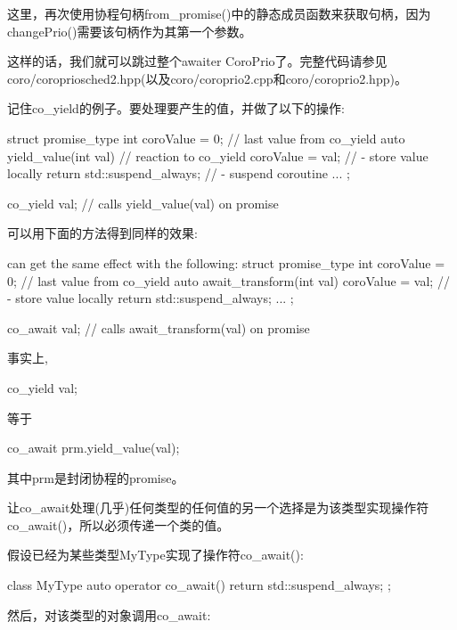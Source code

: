这里，再次使用协程句柄from\_promise()中的静态成员函数来获取句柄，因为changePrio()需要该句柄作为其第一个参数。

这样的话，我们就可以跳过整个awaiter CoroPrio了。完整代码请参见coro/coropriosched2.hpp(以及coro/coroprio2.cpp和coro/coroprio2.hpp)。


记住co\_yield的例子。要处理要产生的值，并做了以下的操作:

\begin{cpp}
struct promise_type {
	int coroValue = 0; // last value from co_yield
	auto yield_value(int val) { // reaction to co_yield
		coroValue = val; // - store value locally
		return std::suspend_always{}; // - suspend coroutine
	}
	...
};

co_yield val; // calls yield_value(val) on promise
\end{cpp}

可以用下面的方法得到同样的效果:

\begin{cpp}
 can get the same effect with the following:
struct promise_type {
	int coroValue = 0; // last value from co_yield
	auto await_transform(int val) {
		coroValue = val; // - store value locally
		return std::suspend_always{};
	}
	...
};

co_await val; // calls await_transform(val) on promise
\end{cpp}

事实上,

\begin{cpp}
co_yield val;
\end{cpp}

等于

\begin{cpp}
co_await prm.yield_value(val);
\end{cpp}

其中prm是封闭协程的promise。


让co\_await处理(几乎)任何类型的任何值的另一个选择是为该类型实现操作符co\_await()，所以必须传递一个类的值。

假设已经为某些类型MyType实现了操作符co\_await():

\begin{cpp}
class MyType {
	auto operator co_await() {
		return std::suspend_always{};
	}
};
\end{cpp}

然后，对该类型的对象调用co\_await:

